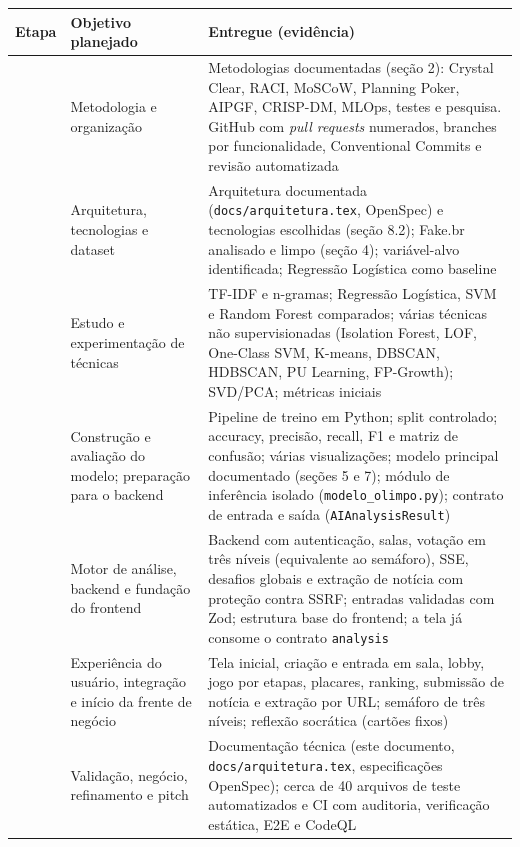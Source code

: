 \documentclass[
  brazilian,
  11pt,
]{article}
\newcounter{none} %
\begin{document}
{\def\LTcaptype{none} %
\begin{longtable}[]{@{}
  >{\raggedright\arraybackslash}p{}
  >{\raggedright\arraybackslash}p{}
  >{\raggedright\arraybackslash}p{}@{}}
\toprule\noalign{}
\textbf{Etapa} & \textbf{Objetivo planejado} & \textbf{Entregue (evidência)} \\
\midrule\noalign{}
\endhead
\bottomrule\noalign{}
\endlastfoot
1 & Metodologia e organização & Metodologias documentadas (seção 2): Crystal Clear, RACI, MoSCoW, Planning Poker, AIPGF, CRISP-DM, MLOps, testes e pesquisa. GitHub com \emph{pull requests} numerados, branches por funcionalidade, Conventional Commits e revisão automatizada \\
2 & Arquitetura, tecnologias e dataset & Arquitetura documentada (\texttt{docs/arquitetura.tex}, OpenSpec) e tecnologias escolhidas (seção 8.2); Fake.br analisado e limpo (seção 4); variável-alvo identificada; Regressão Logística como baseline \\
3 & Estudo e experimentação de técnicas & TF-IDF e n-gramas; Regressão Logística, SVM e Random Forest comparados; várias técnicas não supervisionadas (Isolation Forest, LOF, One-Class SVM, K-means, DBSCAN, HDBSCAN, PU Learning, FP-Growth); SVD/PCA; métricas iniciais \\
4 & Construção e avaliação do modelo; preparação para o backend & Pipeline de treino em Python; split controlado; accuracy, precisão, recall, F1 e matriz de confusão; várias visualizações; modelo principal documentado (seções 5 e 7); módulo de inferência isolado (\texttt{modelo\_olimpo.py}); contrato de entrada e saída (\texttt{AIAnalysisResult}) \\
5 & Motor de análise, backend e fundação do frontend & Backend com autenticação, salas, votação em três níveis (equivalente ao semáforo), SSE, desafios globais e extração de notícia com proteção contra SSRF; entradas validadas com Zod; estrutura base do frontend; a tela já consome o contrato \texttt{analysis} \\
6 & Experiência do usuário, integração e início da frente de negócio & Tela inicial, criação e entrada em sala, lobby, jogo por etapas, placares, ranking, submissão de notícia e extração por URL; semáforo de três níveis; reflexão socrática (cartões fixos) \\
7 & Validação, negócio, refinamento e pitch & Documentação técnica (este documento, \texttt{docs/arquitetura.tex}, especificações OpenSpec); cerca de 40 arquivos de teste automatizados e CI com auditoria, verificação estática, E2E e CodeQL \\
\end{longtable}
}
\end{document}
